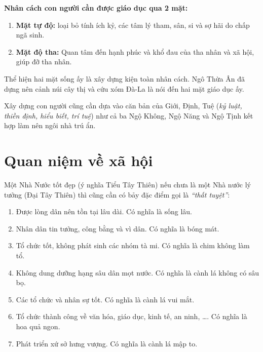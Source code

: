 {\bf Nhân cách con người cần được giáo dục qua 2 mặt:}

\begin{enumerate}[label=\itshape\alph*\upshape/]
   \item {\bf Mặt tự độ:} loại bỏ tính ích kỷ, các tâm lý tham, sân, si và sợ hãi do chấp ngã sinh.

   \item {\bf Mặt độ tha:} Quan tâm đến hạnh phúc và khổ đau của tha nhân và xã hội, giúp đỡ tha nhân.
\end{enumerate}

Thể hiện hai mặt sống ấy là xây dựng kiện toàn nhân cách. Ngô Thừa Ân đã dựng nên cảnh núi cây thị và cứu xóm Đà-La là nói đến hai mặt giáo dục ấy.

Xây dựng con người cũng cần dựa vào căn bản của Giới, Định, Tuệ (\emph{kỷ luật, thiền định, hiểu biết, trí tuệ}) như cả ba Ngộ Không, Ngộ Năng và Ngộ Tịnh kết hợp làm nên ngôi nhà trú ẩn.

\section{Quan niệm về xã hội} %
\label{sec:67_xa_hoi}

Một Nhà Nước tốt đẹp (ý nghĩa Tiểu Tây Thiên) nếu chưa là một Nhà nước lý tưởng (Đại Tây Thiên) thì cũng cần có bảy đặc điểm gọi là \emph{``thất tuyệt''}:

\begin{enumerate}[label=\itshape\arabic*\upshape/]

    \item Được lòng dân nên tồn tại lâu dài. Có nghĩa là sống lâu.

    \item Nhân dân tin tưởng, công bằng và vì dân. Có nghĩa là bóng mát.

    \item Tổ chức tốt, không phát sinh các nhóm tà mi. Có nghĩa là chim không làm tổ.

    \item Không dung dưỡng hạng sâu dân mọt nước. Có nghĩa là cành lá không có sâu bọ.

    \item Các tổ chức và nhân sự tốt. Có nghĩa là cành lá vui mắt.

    \item Tổ chức thành công về văn hóa, giáo dục, kinh tế, an ninh, \ldots. Có nghĩa là hoa quả ngon.

    \item Phát triển xứ sở hưng vượng. Có nghĩa là cành lá mập to.
\end{enumerate}

